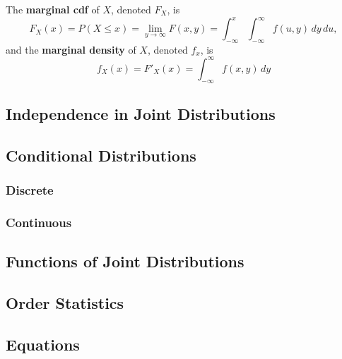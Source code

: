 \documentclass[a4paper,10pt]{article}
\begin{document}
The \textbf{marginal cdf} of $X$, denoted $F_X$, is 
\begin{equation*}
    F_X(x) = P(X\leq x) = \lim_{y\to\infty}F(x, y) = \int_{-\infty}^x \int_{-\infty}^{\infty}f(u, y)\,dy\,du,
\end{equation*}
and the \textbf{marginal density} of $X$, denoted $f_x$, is 
\begin{equation*}
    f_X(x) = F'_X(x) = \int_{-\infty}^{\infty}f(x, y)\,dy 
\end{equation*}


\subsection{Independence in Joint Distributions}

\subsection{Conditional Distributions}
\subsubsection{Discrete}
\subsubsection{Continuous}

\subsection{Functions of Joint Distributions}

\subsection{Order Statistics}

\subsection{Equations}
\end{document}
